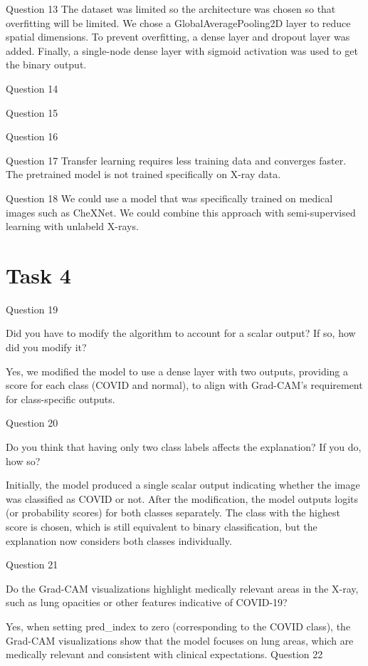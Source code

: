 \documentclass[conference]{IEEEtran}
\begin{document}
Question 13
The dataset was limited so the architecture was chosen so that overfitting will be limited. We chose a GlobalAveragePooling2D layer to reduce spatial dimensions.
To prevent overfitting, a dense layer and dropout layer was added. Finally, a single-node dense layer with sigmoid activation was used to get the binary output.

Question 14

Question 15

Question 16

Question 17
Transfer learning requires less training data and converges faster. 
The pretrained model is not trained specifically on X-ray data.

Question 18
We could use a model that was specifically trained on medical images such as CheXNet.
We could combine this approach with semi-supervised learning with unlabeld X-rays.

\section{Task 4}

Question 19

Did you have to modify the algorithm to account for a scalar output? If so, how did you modify it?

Yes, we modified the model to use a dense layer with two outputs, providing a score for each class (COVID and normal), to align with Grad-CAM’s requirement for class-specific outputs.

Question 20

Do you think that having only two class labels affects the explanation? If you do, how so?

Initially, the model produced a single scalar output indicating whether the image was classified as COVID or not.
After the modification, the model outputs logits (or probability scores) for both classes separately. The class with the highest score is chosen, which is still equivalent to binary classification, but the explanation now considers both classes individually.

Question 21

Do the Grad-CAM visualizations highlight medically relevant areas in the X-ray, such as lung opacities or other features indicative of COVID-19?

Yes, when setting pred\_index to zero (corresponding to the COVID class), the Grad-CAM visualizations show that the model focuses on lung areas, which are medically relevant and consistent with clinical expectations.
Question 22
\end{document}
